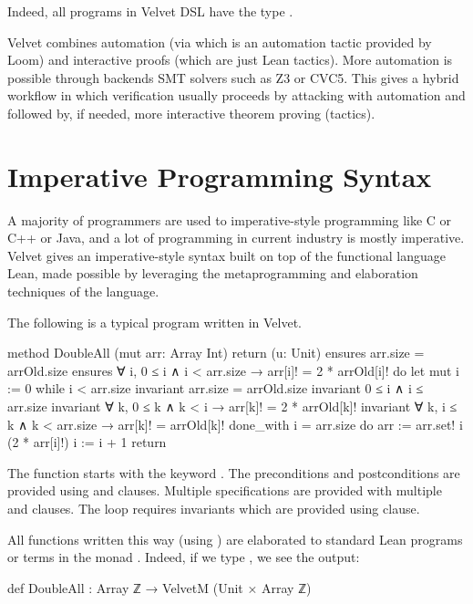 Indeed, all programs in Velvet DSL have the type .

Velvet combines automation (via  which is an automation tactic
provided by Loom) and interactive proofs (which are just Lean tactics). More
automation is possible through backends SMT solvers such as Z3 or CVC5. This
gives a hybrid workflow in which verification usually proceeds by attacking with
automation and followed by, if needed, more interactive theorem proving
(tactics).

\section{Imperative Programming Syntax}

A majority of programmers are used to imperative-style programming like C or C++
or Java, and a lot of programming in current industry is mostly imperative.
Velvet gives an imperative-style syntax built on top of the functional language
Lean, made possible by leveraging the metaprogramming and elaboration techniques
of the language.

The following is a typical program written in Velvet.

\begin{leanblock}
method DoubleAll (mut arr: Array Int) return (u: Unit)
    ensures arr.size = arrOld.size
    ensures ∀ i, 0 ≤ i ∧ i < arr.size → arr[i]! = 2 * arrOld[i]!
    do
    let mut i := 0
    while i < arr.size
        invariant arr.size = arrOld.size
        invariant 0 ≤ i ∧ i ≤ arr.size
        invariant ∀ k, 0 ≤ k ∧ k < i → arr[k]! = 2 * arrOld[k]!
        invariant ∀ k, i ≤ k ∧ k < arr.size → arr[k]! = arrOld[k]!
        done_with i = arr.size
    do
        arr := arr.set! i (2 * arr[i]!)
        i := i + 1
    return
\end{leanblock}

The function starts with the keyword . The preconditions and
postconditions are provided using  and  clauses.
Multiple specifications are provided with multiple  and
 clauses. The  loop requires invariants which are
provided using  clause.

All functions written this way (using ) are elaborated to standard
Lean programs or terms in the monad . Indeed, if we type
, we see the output:

\begin{leanblock}
def DoubleAll : Array ℤ → VelvetM (Unit × Array ℤ)
\end{leanblock}

